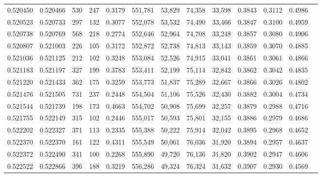 \begin{tabular}{rrrrrrrrrrrrr}
0.520450 & 0.520466 &   530 &   247 &                                     0.3179 & 551,781 &  53,829 &  74,358 &  33,598 & 0.3843 & 0.3112 & 0.4986 \\
0.520523 & 0.520733 &   297 &   132 &                                     0.3077 & 552,078 &  53,532 &  74,490 &  33,466 & 0.3847 & 0.3100 & 0.4959 \\
0.520738 & 0.520769 &   568 &   218 &                                     0.2774 & 552,646 &  52,964 &  74,708 &  33,248 & 0.3857 & 0.3080 & 0.4906 \\
0.520807 & 0.521003 &   226 &   105 &                                     0.3172 & 552,872 &  52,738 &  74,813 &  33,143 & 0.3859 & 0.3070 & 0.4885 \\
0.521036 & 0.521125 &   212 &   102 &                                     0.3248 & 553,084 &  52,526 &  74,915 &  33,041 & 0.3861 & 0.3061 & 0.4866 \\
0.521183 & 0.521197 &   327 &   199 &                                     0.3783 & 553,411 &  52,199 &  75,114 &  32,842 & 0.3862 & 0.3042 & 0.4835 \\
0.521220 & 0.521433 &   362 &   175 &                                     0.3259 & 553,773 &  51,837 &  75,289 &  32,667 & 0.3866 & 0.3026 & 0.4802 \\
0.521476 & 0.521505 &   731 &   237 &                                     0.2448 & 554,504 &  51,106 &  75,526 &  32,430 & 0.3882 & 0.3004 & 0.4734 \\
0.521544 & 0.521739 &   198 &   173 &                                     0.4663 & 554,702 &  50,908 &  75,699 &  32,257 & 0.3879 & 0.2988 & 0.4716 \\
0.521755 & 0.522149 &   315 &   102 &                                     0.2446 & 555,017 &  50,593 &  75,801 &  32,155 & 0.3886 & 0.2979 & 0.4686 \\
0.522202 & 0.522327 &   371 &   113 &                                     0.2335 & 555,388 &  50,222 &  75,914 &  32,042 & 0.3895 & 0.2968 & 0.4652 \\
0.522370 & 0.522370 &   161 &   122 &                                     0.4311 & 555,549 &  50,061 &  76,036 &  31,920 & 0.3894 & 0.2957 & 0.4637 \\
0.522372 & 0.522490 &   341 &   100 &                                     0.2268 & 555,890 &  49,720 &  76,136 &  31,820 & 0.3902 & 0.2947 & 0.4606 \\
0.522522 & 0.522866 &   396 &   188 &                                     0.3219 & 556,286 &  49,324 &  76,324 &  31,632 & 0.3907 & 0.2930 & 0.4569 \\

\end{tabular}
